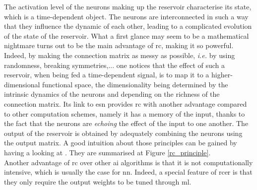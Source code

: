 The activation level of the neurons making up the reservoir characterise its state, which is a time-dependent object. The neurons are interconnected in such a way that they influence the dynamic of each other, leading to a complicated evolution of the state of the reservoir. What a first glance may seem to be a mathematical nightmare turns out to be the main advantage of \gls{rc}, making it so powerful. Indeed, by making the connection matrix as messy as possible, \textit{i.e.} by using randomness, breaking symmetries,... one notices that the effect of such a reservoir, when being fed a time-dependent signal, is to map it to a higher-dimensional functional space, the dimensionality being determined by the intrinsic dynamics of the neurons and depending on the richness of the connection matrix. Its link to \gls{esn} provides \gls{rc} with another advantage compared to other computation schemes,  namely it has a memory of the input, thanks to the fact that the neurons are \textit{echoing} the effect of the input to one another. The output of the reservoir is obtained by adequately combining the neurons using the output matrix. A good intuition about those principles can be gained by having a looking at \cite{Goudarzi2014ACS}. They are summarised at Figure \ref{rc_principle}.\\

Another advantage of \gls{rc} over other \gls{ai} algorithms is that it is not computationally intensive, which is usually the case for \gls{nn}. Indeed, a special feature of \gls{rcer} is that they only require the output weights to be tuned through \gls{ml}.
